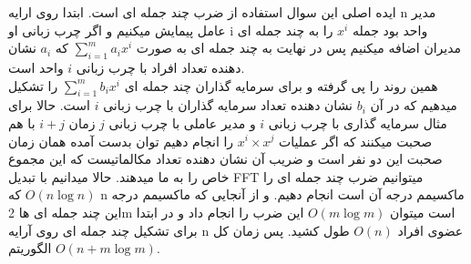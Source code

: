 \problem{}
ایده اصلی این سوال استفاده از ضرب چند جمله ای است.
ابتدا روی ارایه n مدیر عامل پیمایش میکنیم
و اگر چرب زبانی او i واحد بود
جمله  $x^i$ را به چند جمله ای مدیران اضافه میکنیم
پس در نهایت به چند جمله ای به صورت $\sum_{i=1}^{m}{a_i x^i}$
که $a_i$ نشان دهنده تعداد افراد با چرب زبانی $i$ واحد است.
\\
همین روند را پی گرفته و برای سرمایه گذاران چند جمله ای $\sum_{i=1}^{m}{b_i x^i}$ را تشکیل میدهیم
که در آن $b_i$ نشان دهنده تعداد سرمایه گذاران با چرب زبانی $i$ است.
حالا برای مثال سرمایه گذاری با چرب زبانی $i$  و مدیر عاملی با چرب زبانی $j$ 
زمان $i+j$ با هم صحبت میکنند که اگر عملیات
$x^i \times x^j$ را انجام دهیم توان بدست آمده همان زمان صحبت این دو نفر است
و ضریب آن نشان دهنده تعداد مکالماتیست که این مجموع خاص را به ما میدهند.
حالا میدانیم با تبدیل FFT  میتوانیم ضرب چند جمله ای را $O(n\log n)$ که n ماکسیمم درجه
آن است انجام دهیم.
و از آنجایی که ماکسیمم درجه این چند جمله ای ها 2m است
میتوان $O(m\log m)$
این ضرب را انجام داد و در ابتدا برای تشکیل چند جمله ای روی آرایه n 
عضوی افراد $O(n)$ طول کشید.
پس زمان کل الگوریتم $O(n+m\log{m})$.
